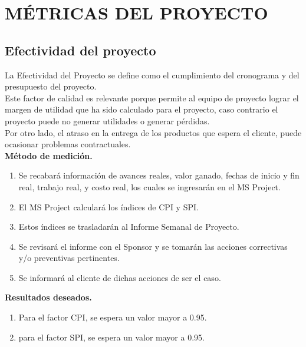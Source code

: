 \chapter{M\'ETRICAS DEL PROYECTO}
%
\section{Efectividad del proyecto}
%
La Efectividad del Proyecto se define como el cumplimiento del cronograma y del presupuesto del
proyecto.\\%
%
Este factor de calidad es relevante porque permite al equipo de proyecto lograr el margen de utilidad
que ha sido calculado para el proyecto, caso contrario el proyecto puede no generar utilidades o 
generar p\'erdidas.\\
%
Por otro lado, el atraso en la entrega de los productos que espera el cliente, puede ocasionar
problemas contractuales.\\[0.5cm]%
%
\textbf{M\'etodo de medici\'on.}
%
\begin{enumerate}
	\item Se recabar\'a informaci\'on de avances reales, valor ganado, fechas de inicio y fin real, trabajo
		real, y costo real, los cuales se ingresar\'an en el MS Project.
	\item El MS Project calcular\'a los \'indices de CPI y SPI.
	\item Estos \'indices se trasladar\'an al Informe Semanal de Proyecto.
	\item Se revisar\'a el informe con el Sponsor y se tomar\'an las acciones correctivas y/o preventivas
		pertinentes.
	\item Se informar\'a al cliente de dichas acciones de ser el caso.
\end{enumerate}
%
\textbf{Resultados deseados.}
%
\begin{enumerate}
	\item Para el factor CPI, se espera un valor mayor a 0.95.
	\item para el factor SPI, se espera un valor mayor a 0.95.
\end{enumerate}
%

